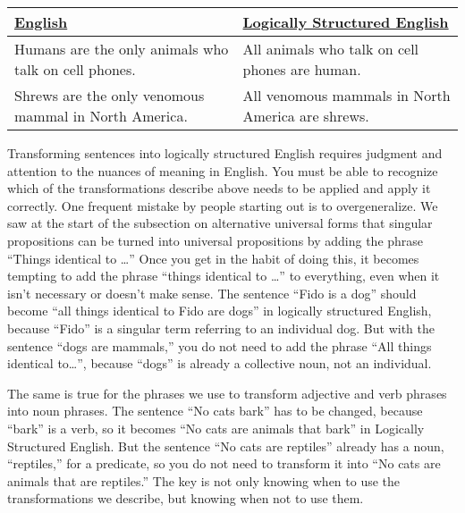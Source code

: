 \begin{table*}
\begin{longtabu}{p{.5\linewidth}p{.5\linewidth}}
\underline{English} & \underline{Logically Structured English} \\
\endhead
Humans are the only animals who talk on cell phones. & All animals who talk on cell phones are human.\\
Shrews are the only venomous mammal in North America. & All venomous mammals in North America are shrews.\\
\end{longtabu}
\end{table*}

Transforming sentences into \gls{logically structured English} requires judgment and attention to the nuances of meaning in English. You must be able to recognize which of the transformations describe above needs to be applied and apply it correctly. One frequent mistake by people starting out is to overgeneralize. We saw at the start of the subsection on alternative universal forms that singular propositions can be turned into universal propositions by adding the phrase ``Things identical to \ldots'' Once you get in the habit of doing this, it becomes tempting to add the phrase ``things identical to \ldots'' to everything, even when it isn't necessary or doesn't make sense. The sentence ``Fido is a dog'' should become ``all things identical to Fido are dogs'' in logically structured English, because ``Fido'' is a singular term referring to an individual dog. But with the sentence ``dogs are mammals,'' you do not need to add the phrase ``All things identical to\ldots'', because ``dogs'' is already a collective noun, not an individual.

The same is true for the phrases we use to transform adjective and verb phrases into noun phrases. The sentence ``No cats bark'' has to be changed, because ``bark'' is a verb, so it becomes ``No cats are animals that bark'' in Logically Structured English. But the sentence ``No cats are reptiles'' already has a noun, ``reptiles,'' for a predicate, so you do not need to transform it into ``No cats are animals that are reptiles.'' The key is not only knowing when to use the transformations we describe, but knowing when not to use them.



